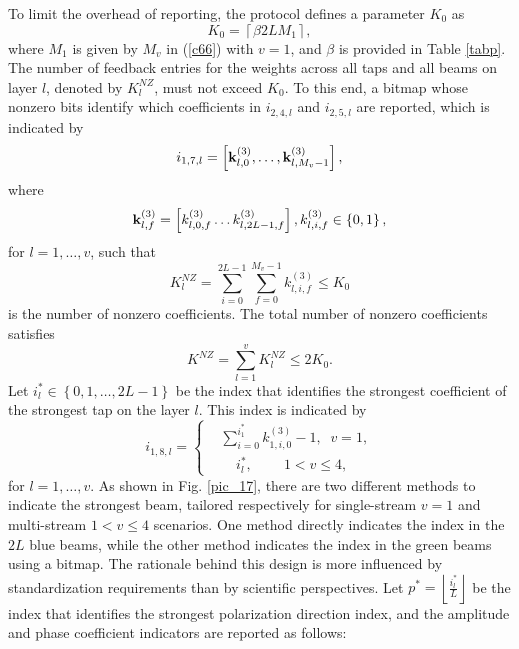 \documentclass[lettersize,journal]{IEEEtran}
\begin{document}
To limit the overhead of reporting, the protocol defines a parameter $ K_0 $ as
\begin{equation}
K_0=\left\lceil\beta2LM_1\right\rceil ,   
\end{equation}
where $M_1$ is given by $M_v$ in (\ref{c66}) with $v=1$, and $\beta$ is provided in Table \ref{tabp}. The number of feedback entries for the weights across all taps and all beams on layer $l$, denoted by $K_l^{NZ}$, must not exceed $K_0$. To this end, a bitmap whose nonzero bits identify which coefficients in $i_{2,4,l}$ and $i_{2,5,l}$ are reported, which is indicated by 
\begin{equation}
i_{1,7,l}=\left[{\bf{k}}_{l,0}^{\left(3\right)},\ldots, {\bf{k}}_{l,M_v-1}^{\left(3\right)}\right],    
\end{equation}
where 
\begin{equation}
 {\bf{k}}_{l,f}^{\left(3\right)}=\left[k_{l,0,f}^{\left(3\right)}\ldots k_{l,2L-1,f}^{\left(3\right)}\right],   k_{l,i,f}^{(3)}\in\left\{0,1\right\},
\end{equation}
for $l=1,\ldots,v$, such that
\begin{equation}
K_l^{NZ}=\sum_{i=0}^{2L-1}\sum_{f=0}^{M_v-1}k_{l,i,f}^{(3)}\le K_0    
\end{equation}
is the number of nonzero coefficients. The total number of nonzero coefficients satisfies
\begin{equation}
K^{NZ}=\sum_{l=1}^{v}K_l^{NZ}\le2K_0.    
\end{equation}
Let $i_l^\ast\in\left\{0,1,\ldots,2L-1\right\}$ be the index that identifies the strongest coefficient of the strongest tap on the layer $l$. This index is indicated by 
\begin{equation}
{i_{1,8,l}} = \left\{ {\begin{aligned}
&{\sum\nolimits_{i = 0}^{i_1^ * } {k_{1,i,0}^{(3)}}  - 1,\;\; v = 1, }\\
&\;\;\;\;{i_l^ * ,\;\;\;\;\;\;\;\;1 < v \le 4,}
\end{aligned}} \right.
\end{equation}
for $l=1,\ldots,v$. As shown in Fig. \ref{pic_17}, there are two different methods to indicate the strongest beam, tailored respectively for single-stream $v = 1$ and multi-stream $1 < v \le 4$ scenarios. One method directly indicates the index in the $2L$ blue beams, while the other method indicates the index in the green beams using a bitmap. The rationale behind this design is more influenced by standardization requirements than by scientific perspectives. Let $p^\ast=\left\lfloor\frac{i_l^\ast}{L}\right\rfloor$ be the index that identifies the strongest polarization direction index, and the amplitude and phase coefficient indicators are reported as follows:
\end{document}
